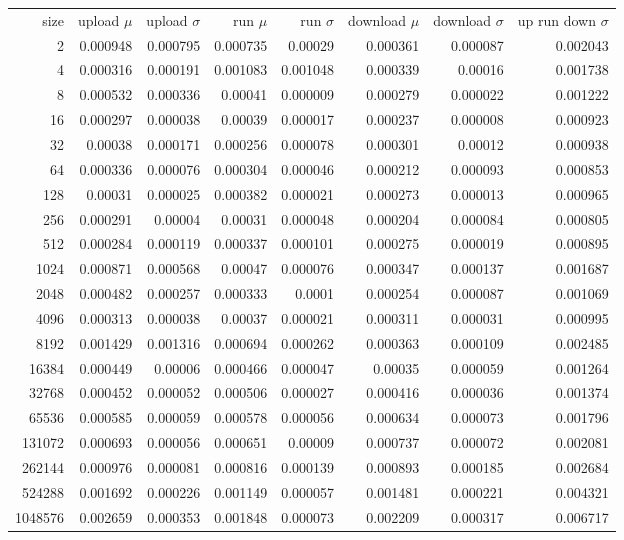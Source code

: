 \begin{tabular}{r r r r r r r r}
size & upload $\mu$  & upload $\sigma$ & run $\mu$ & run $\sigma$ & download $\mu$ & download $\sigma$ & up run down $\sigma$ \\
2 & 0.000948 & 0.000795 & 0.000735 & 0.00029 & 0.000361 & 0.000087 & 0.002043 \\
4 & 0.000316 & 0.000191 & 0.001083 & 0.001048 & 0.000339 & 0.00016 & 0.001738 \\
8 & 0.000532 & 0.000336 & 0.00041 & 0.000009 & 0.000279 & 0.000022 & 0.001222 \\
16 & 0.000297 & 0.000038 & 0.00039 & 0.000017 & 0.000237 & 0.000008 & 0.000923 \\
32 & 0.00038 & 0.000171 & 0.000256 & 0.000078 & 0.000301 & 0.00012 & 0.000938 \\
64 & 0.000336 & 0.000076 & 0.000304 & 0.000046 & 0.000212 & 0.000093 & 0.000853 \\
128 & 0.00031 & 0.000025 & 0.000382 & 0.000021 & 0.000273 & 0.000013 & 0.000965 \\
256 & 0.000291 & 0.00004 & 0.00031 & 0.000048 & 0.000204 & 0.000084 & 0.000805 \\
512 & 0.000284 & 0.000119 & 0.000337 & 0.000101 & 0.000275 & 0.000019 & 0.000895 \\
1024 & 0.000871 & 0.000568 & 0.00047 & 0.000076 & 0.000347 & 0.000137 & 0.001687 \\
2048 & 0.000482 & 0.000257 & 0.000333 & 0.0001 & 0.000254 & 0.000087 & 0.001069 \\
4096 & 0.000313 & 0.000038 & 0.00037 & 0.000021 & 0.000311 & 0.000031 & 0.000995 \\
8192 & 0.001429 & 0.001316 & 0.000694 & 0.000262 & 0.000363 & 0.000109 & 0.002485 \\
16384 & 0.000449 & 0.00006 & 0.000466 & 0.000047 & 0.00035 & 0.000059 & 0.001264 \\
32768 & 0.000452 & 0.000052 & 0.000506 & 0.000027 & 0.000416 & 0.000036 & 0.001374 \\
65536 & 0.000585 & 0.000059 & 0.000578 & 0.000056 & 0.000634 & 0.000073 & 0.001796 \\
131072 & 0.000693 & 0.000056 & 0.000651 & 0.00009 & 0.000737 & 0.000072 & 0.002081 \\
262144 & 0.000976 & 0.000081 & 0.000816 & 0.000139 & 0.000893 & 0.000185 & 0.002684 \\
524288 & 0.001692 & 0.000226 & 0.001149 & 0.000057 & 0.001481 & 0.000221 & 0.004321 \\
1048576 & 0.002659 & 0.000353 & 0.001848 & 0.000073 & 0.002209 & 0.000317 & 0.006717 \\

\end{tabular}
